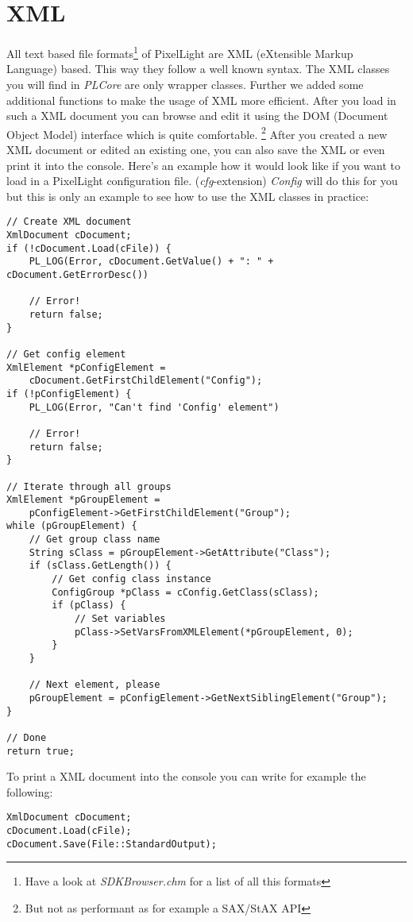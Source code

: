 \section{XML}
All text based file formats\footnote{Have a look at \emph{SDKBrowser.chm} for a list of all this formats} of PixelLight are XML (eXtensible Markup Language) based. This way they follow a well known syntax. The XML classes you will find in \emph{PLCore} are only wrapper classes. Further we added some additional functions to make the usage of XML more efficient. After you load in such a XML document you can browse and edit it using the DOM (Document Object Model) interface which is quite comfortable. \footnote{But not as performant as for example a SAX/StAX API} After you created a new XML document or edited an existing one, you can also save the XML or even print it into the console. Here's an example how it would look like if you want to load in a PixelLight configuration file. (\emph{cfg}-extension) \emph{Config} will do this for you but this is only an example to see how to use the XML classes in practice:

\begin{lstlisting}[caption=XML DOM usage example]
// Create XML document
XmlDocument cDocument;
if (!cDocument.Load(cFile)) {
	PL_LOG(Error, cDocument.GetValue() + ": " + cDocument.GetErrorDesc())

	// Error!
	return false;
}

// Get config element
XmlElement *pConfigElement =
	cDocument.GetFirstChildElement("Config");
if (!pConfigElement) {
	PL_LOG(Error, "Can't find 'Config' element")

	// Error!
	return false;
}

// Iterate through all groups
XmlElement *pGroupElement =
	pConfigElement->GetFirstChildElement("Group");
while (pGroupElement) {
	// Get group class name
	String sClass = pGroupElement->GetAttribute("Class");
	if (sClass.GetLength()) {
		// Get config class instance
		ConfigGroup *pClass = cConfig.GetClass(sClass);
		if (pClass) {
			// Set variables
			pClass->SetVarsFromXMLElement(*pGroupElement, 0);
		}
	}

	// Next element, please
	pGroupElement = pConfigElement->GetNextSiblingElement("Group");
}

// Done
return true;
\end{lstlisting}

To print a XML document into the console you can write for example the following:

\begin{lstlisting}[caption=Print XML document into the console]
XmlDocument cDocument;
cDocument.Load(cFile);
cDocument.Save(File::StandardOutput);
\end{lstlisting}
